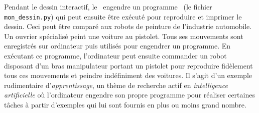 {\begin{minipage}{\myparboxwidth}
Pendant le dessin interactif, le \robot\ engendre un programme \python\ 
(le fichier {\tt mon\_dessin.py})
qui peut ensuite être exécuté
pour reproduire et imprimer le dessin. Ceci peut être comparé aux robots
de peinture de l'industrie automobile. Un ouvrier spécialisé peint une
voiture au pistolet. Tous ses mouvements sont en\-re\-gis\-trés sur 
ordinateur puis utilisés pour engendrer un programme. En exécutant ce 
programme, l'ordinateur peut ensuite commander un robot disposant d'un bras 
manipulateur portant un pistolet pour reproduire fidèlement tous ces 
mouvements et peindre indéfiniment des voitures. Il s'agit d'un exemple rudimentaire
d'{\em apprentissage}, un thème de recherche actif en {\em intelligence
artificielle} où l'ordinateur engendre son propre 
programme pour réaliser certaines tâches à partir d'exemples qui lui sont fournis
en plus ou moins grand nombre.

\vspace{\abovedisplayskip}
\end{minipage}
}

\noindent {}
